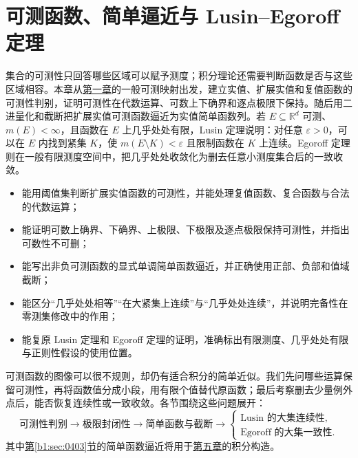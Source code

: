 \chapter{可测函数、简单逼近与 Lusin--Egoroff 定理}
\label{b1:ch:04}

\begin{chapterabstract}
集合的可测性只回答哪些区域可以赋予测度；积分理论还需要判断函数是否与这些区域相容。本章从\hyperref[b1:ch:01]{第一章}的一般可测映射出发，建立实值、扩展实值和复值函数的可测性判别，证明可测性在代数运算、可数上下确界和逐点极限下保持。随后用二进量化和截断把扩展实值可测函数逼近为实值简单函数列。若 \(E\subseteq\mathbb R^d\) 可测、\(m(E)<\infty\)，且函数在 \(E\) 上几乎处处有限，Lusin 定理说明：对任意 \(\varepsilon>0\)，可以在 \(E\) 内找到紧集 \(K\)，使 \(m(E\setminus K)<\varepsilon\) 且限制函数在 \(K\) 上连续。Egoroff 定理则在一般有限测度空间中，把几乎处处收敛化为删去任意小测度集合后的一致收敛。
\end{chapterabstract}

\begin{learninggoals}
\begin{itemize}
  \item \label{b1:item:0400-goal-1}能用阈值集判断扩展实值函数的可测性，并能处理复值函数、复合函数与合法的代数运算；
  \item \label{b1:item:0400-goal-2}能证明可数上确界、下确界、上极限、下极限及逐点极限保持可测性，并指出可数性不可删；
  \item \label{b1:item:0400-goal-3}能写出非负可测函数的显式单调简单函数逼近，并正确使用正部、负部和值域截断；
  \item \label{b1:item:0400-goal-4}能区分“几乎处处相等”“在大紧集上连续”与“几乎处处连续”，并说明完备性在零测集修改中的作用；
  \item \label{b1:item:0400-goal-5}能复原 Lusin 定理和 Egoroff 定理的证明，准确标出有限测度、几乎处处有限与正则性假设的使用位置。
\end{itemize}
\end{learninggoals}

可测函数的图像可以很不规则，却仍有适合积分的简单近似。我们先问哪些运算保留可测性，再将函数值分成小段，用有限个值替代原函数；最后考察删去少量例外点后，能否恢复连续性或一致收敛。各节围绕这些问题展开：
\[
\text{可测性判别}
\longrightarrow \text{极限封闭性}
\longrightarrow \text{简单函数与截断}
\longrightarrow
\begin{cases}
\text{Lusin 的大集连续性},\\
\text{Egoroff 的大集一致性}.
\end{cases}
\]
其中\hyperref[b1:sec:0403]{第\ref*{b1:sec:0403}节}的简单函数逼近将用于\hyperref[b1:ch:05]{第五章}的积分构造。


